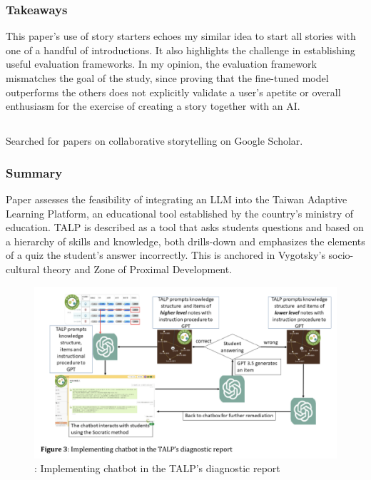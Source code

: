 \documentclass[
	letterpaper, %
]{jdf}
\begin{document}
\subsubsection{Takeaways}
This paper's use of story starters echoes my similar idea to start all stories with one of a handful of introductions. It also highlights the challenge in establishing useful evaluation frameworks. In my opinion, the evaluation framework mismatches the goal of the study, since proving that the fine-tuned model outperforms the others does not explicitly validate a user's apetite or overall enthusiasm for the exercise of creating a story together with an AI.

\subsection{}
Searched for papers on collaborative storytelling on Google Scholar.

\subsubsection{Summary}
Paper assesses the feasibility of integrating an LLM into the Taiwan Adaptive Learning Platform, an educational tool established by the country's ministry of education. TALP is described as a tool that asks students questions and based on a hierarchy of skills and knowledge, both drills-down and emphasizes the elements of a quiz the student's answer incorrectly. This is anchored in Vygotsky's socio-cultural theory and Zone of Proximal Development. 

\begin{figure}
    \centering
    \includegraphics[width=0.5\linewidth]{Assignments//Assignment 3/TALP_GPT.png}
    \caption{: Implementing chatbot in the TALP’s diagnostic report}
    \label{fig:enter-label}
\end{figure}
\end{document}
